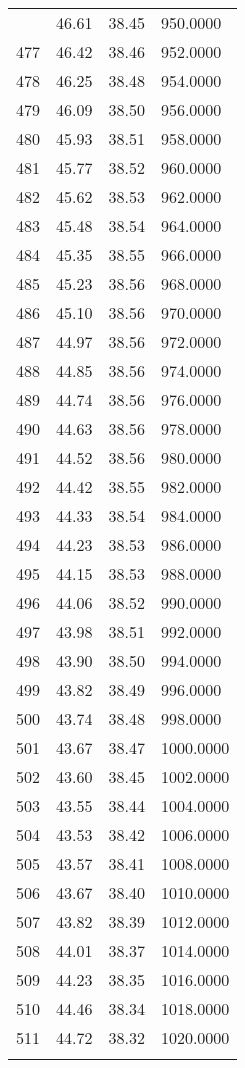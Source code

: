 \documentclass[
  captions=tableheading,
]{scrartcl}
\begin{document}
\begin{longtable} {l|l|l|l}
{476	& 46.61 &	38.45 &	950.0000\\
477	& 46.42 &	38.46 &	952.0000\\
478	& 46.25 &	38.48 &	954.0000\\
479	& 46.09 &	38.50 &	956.0000\\
480	& 45.93 &	38.51 &	958.0000\\
481	& 45.77 &	38.52 &	960.0000\\
482	& 45.62 &	38.53 &	962.0000\\
483	& 45.48 &	38.54 &	964.0000\\
484	& 45.35 &	38.55 &	966.0000\\
485	& 45.23 &	38.56 &	968.0000\\
486	& 45.10 &	38.56 &	970.0000\\
487	& 44.97 &	38.56 &	972.0000\\
488	& 44.85 &	38.56 &	974.0000\\
489	& 44.74 &	38.56 &	976.0000\\
490	& 44.63 &	38.56 &	978.0000\\
491	& 44.52 &	38.56 &	980.0000\\
492	& 44.42 &	38.55 &	982.0000\\
493	& 44.33 &	38.54 &	984.0000\\
494	& 44.23 &	38.53 &	986.0000\\
495	& 44.15 &	38.53 &	988.0000\\
496	& 44.06 &	38.52 &	990.0000\\
497	& 43.98 &	38.51 &	992.0000\\
498	& 43.90 &	38.50 &	994.0000\\
499	& 43.82 &	38.49 &	996.0000\\
500	& 43.74 &	38.48 &	998.0000\\
501	& 43.67 &	38.47 &	1000.0000\\
502	& 43.60 &	38.45 &	1002.0000\\
503	& 43.55 &	38.44 &	1004.0000\\
504	& 43.53 &	38.42 &	1006.0000\\
505	& 43.57 &	38.41 &	1008.0000\\
506	& 43.67 &	38.40 &	1010.0000\\
507	& 43.82 &	38.39 &	1012.0000\\
508	& 44.01 &	38.37 &	1014.0000\\
509	& 44.23 &	38.35 &	1016.0000\\
510	& 44.46 &	38.34 &	1018.0000\\
511	& 44.72 &	38.32 &	1020.0000\\
}
\end{longtable}
\end{document}
